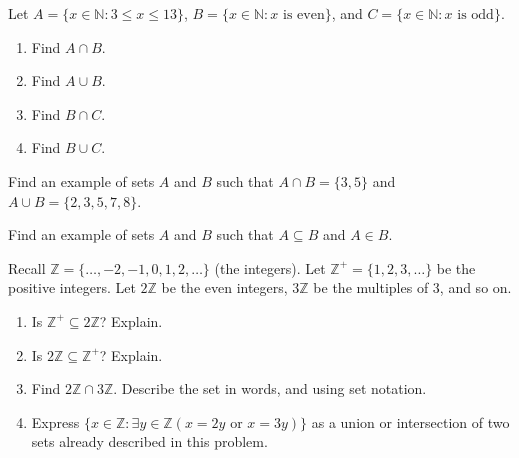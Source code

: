 \documentclass[11pt,]{book}
\theoremstyle{ptxplainnotitle}
\theoremstyle{ptxplaintitle}
\theoremstyle{ptxdefinitionnotitle}
\theoremstyle{ptxdefinitiontitle}
\theoremstyle{ptxdefinitionnotitle}
\theoremstyle{ptxdefinitiontitle}
\theoremstyle{ptxdefinitionnotitle}
\theoremstyle{ptxdefinitiontitle}
\theoremstyle{ptxdefinitiontitlenonumber}
\theoremstyle{ptxdefinitiontitlenonumber}
\numberwithin{equation}{chapter}
\newcommand{\N}{\mathbb N}
\newcommand{\Z}{\mathbb Z}
\newcommand{\st}{:}
\begin{document}
\begin{divisionexercise}{10}\hypertarget{exercise-88}{}
\hypertarget{p-913}{}%
Let \(A = \{x \in \N \st 3 \le x \le 13\}\), \(B = \{x \in \N \st x \mbox{ is even} \}\), and \(C = \{x \in \N \st x \mbox{ is odd} \}\). \leavevmode%
\begin{enumerate}[label=(\alph*)]
\item\hypertarget{li-401}{}\hypertarget{p-914}{}%
Find \(A \cap B\).%
\item\hypertarget{li-402}{}\hypertarget{p-915}{}%
Find \(A \cup B\).%
\item\hypertarget{li-403}{}\hypertarget{p-916}{}%
Find \(B \cap C\).%
\item\hypertarget{li-404}{}\hypertarget{p-917}{}%
Find \(B \cup C\).%
\end{enumerate}
%
\end{divisionexercise}%
\begin{divisionexercise}{11}\hypertarget{exercise-89}{}
\hypertarget{p-918}{}%
Find an example of sets \(A\) and \(B\) such that \(A\cap B = \{3, 5\}\) and \(A \cup B = \{2, 3, 5, 7, 8\}\).%
\end{divisionexercise}%
\begin{divisionexercise}{12}\hypertarget{exercise-90}{}
\hypertarget{p-920}{}%
Find an example of sets \(A\) and \(B\) such that \(A \subseteq B\) and \(A \in B\).%
\end{divisionexercise}%
\begin{divisionexercise}{13}\hypertarget{exercise-91}{}
\hypertarget{p-922}{}%
Recall \(\Z = \{\ldots,-2,-1,0, 1,2,\ldots\}\) (the integers). Let \(\Z^+ = \{1, 2, 3, \ldots\}\) be the positive integers. Let \(2\Z\) be the even integers, \(3\Z\) be the multiples of 3, and so on. \leavevmode%
\begin{enumerate}[label=(\alph*)]
\item\hypertarget{li-405}{}\hypertarget{p-923}{}%
Is \(\Z^+ \subseteq 2\Z\)? Explain.%
\item\hypertarget{li-406}{}\hypertarget{p-924}{}%
Is \(2\Z \subseteq \Z^+\)? Explain.%
\item\hypertarget{li-407}{}\hypertarget{p-925}{}%
Find \(2\Z \cap 3\Z\). Describe the set in words, and using set notation.%
\item\hypertarget{li-408}{}\hypertarget{p-926}{}%
Express \(\{x \in \Z \st \exists y\in \Z (x = 2y \text{ or } x = 3y)\}\) as a union or intersection of two sets already described in this problem.%
\end{enumerate}
%
\end{divisionexercise}%
\end{document}
